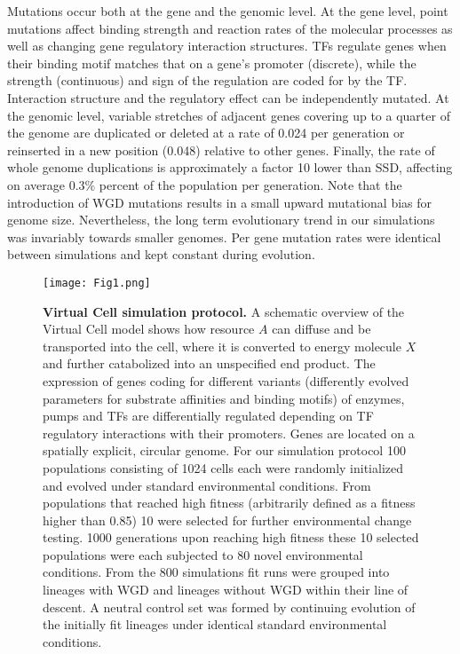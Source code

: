 Mutations occur both at the gene and the genomic level. At the gene level, point mutations affect binding strength and reaction rates of the molecular processes as well as changing gene regulatory interaction structures. TFs regulate genes when their binding motif matches that on a gene's promoter (discrete), while the strength (continuous) and sign of the regulation are coded for by the TF. Interaction structure and the regulatory effect can be independently mutated. At the genomic level, variable stretches of adjacent genes covering up to a quarter of the genome are duplicated or deleted at a rate of 0.024 per generation or reinserted in a new position (0.048) relative to other genes. Finally, the rate of whole genome duplications is approximately a factor 10 lower than SSD, affecting on average 0.3\% percent of the population per generation. Note that the introduction of WGD mutations results in a small upward mutational bias for genome size. Nevertheless, the long term evolutionary trend in our simulations was invariably towards smaller genomes. Per gene mutation rates were identical between simulations and kept constant during evolution. 

\begin{figure*}
\begin{center}
\texttt{[image: Fig1.png]}
\end{center}
\caption{\textbf{Virtual Cell simulation protocol.} A schematic overview of the Virtual Cell model shows how resource $A$ can diffuse and be transported into the cell, where it is converted to energy molecule $X$ and further catabolized into an unspecified end product. The expression of genes coding for different variants (differently evolved parameters for substrate affinities and binding motifs) of enzymes, pumps and TFs are differentially regulated depending on TF regulatory interactions with their promoters. Genes are located on a spatially explicit, circular genome. For our simulation protocol 100 populations consisting of 1024 cells each were randomly initialized and evolved under standard environmental conditions. From populations that reached high fitness (arbitrarily defined as a fitness higher than 0.85) 10 were selected for further environmental change testing. 1000 generations upon reaching high fitness these 10 selected populations were each subjected to 80 novel environmental conditions. From the 800 simulations fit runs were grouped into lineages with WGD and lineages without WGD within their line of descent. A neutral control set was formed by continuing evolution of the initially fit lineages under identical standard environmental conditions.}
\label{protocol}
\end{figure*}

